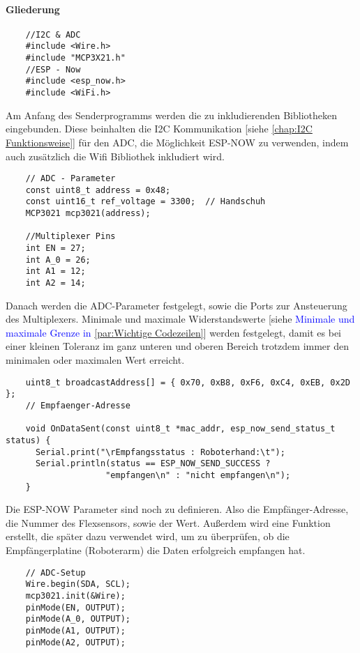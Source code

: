\documentclass[titlepage,12pt,twoside]{article}
\begin{document}
\paragraph{Gliederung}
\hfill \break
\hfill \break
\footnotesize
\begin{lstlisting}
	//I2C & ADC
	#include <Wire.h>
	#include "MCP3X21.h"
	//ESP - Now
	#include <esp_now.h>
	#include <WiFi.h>	
\end{lstlisting}
\hfill \break
\normalsize
Am Anfang des Senderprogramms werden die zu inkludierenden Bibliotheken eingebunden. Diese beinhalten die I2C Kommunikation [siehe \textcolor{blue}{\autoref{chap:I2C Funktionsweise}}] für 
den ADC, die Möglichkeit ESP-NOW zu verwenden, indem auch zusätzlich die Wifi Bibliothek inkludiert wird. \\
\footnotesize
\begin{lstlisting}
	// ADC - Parameter
	const uint8_t address = 0x48;
	const uint16_t ref_voltage = 3300;  // Handschuh
	MCP3021 mcp3021(address);
	
	//Multiplexer Pins
	int EN = 27;
	int A_0 = 26;
	int A1 = 12;
	int A2 = 14;		
\end{lstlisting}
\hfill \break
\normalsize
Danach werden die ADC-Parameter festgelegt, sowie die Ports zur Ansteuerung des Multiplexers. Minimale und maximale 
Widerstandswerte [siehe \textcolor{blue}{Minimale und maximale Grenze in \autoref{par:Wichtige Codezeilen}}] werden festgelegt, damit es bei einer kleinen Toleranz im ganz unteren und oberen Bereich trotzdem immer den 
minimalen oder maximalen Wert erreicht. \\
\footnotesize
\begin{lstlisting}
	uint8_t broadcastAddress[] = { 0x70, 0xB8, 0xF6, 0xC4, 0xEB, 0x2D };  
	// Empfaenger-Adresse
	
	void OnDataSent(const uint8_t *mac_addr, esp_now_send_status_t status) {
	  Serial.print("\rEmpfangsstatus : Roboterhand:\t");
	  Serial.println(status == ESP_NOW_SEND_SUCCESS ? 
	  				"empfangen\n" : "nicht empfangen\n");
	}			
\end{lstlisting}
\hfill \break
\normalsize
Die ESP-NOW Parameter sind noch zu definieren. Also die Empfänger-Adresse, die Nummer des Flexsensors, sowie der Wert. Außerdem 
wird eine Funktion erstellt, die später dazu verwendet wird, um zu überprüfen, ob die Empfängerplatine (Roboterarm) die Daten 
erfolgreich empfangen hat. \\
\footnotesize
\begin{lstlisting}
	// ADC-Setup
	Wire.begin(SDA, SCL);
	mcp3021.init(&Wire);
	pinMode(EN, OUTPUT);
	pinMode(A_0, OUTPUT);
	pinMode(A1, OUTPUT);
	pinMode(A2, OUTPUT);		  
\end{lstlisting}
\end{document}
